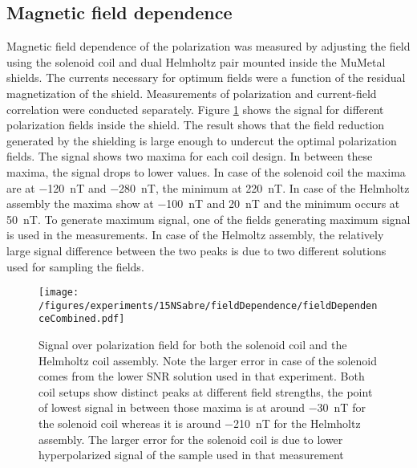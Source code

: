     \subsection{Magnetic field dependence}
    Magnetic field dependence of the polarization was measured by adjusting the field using the solenoid coil and dual Helmholtz pair mounted inside the MuMetal shields. The currents necessary for optimum fields were a function of the residual magnetization of the shield. Measurements of polarization and current-field correlation were conducted separately. Figure \ref{fig:results:15N:fieldDependence} shows the signal for different polarization fields inside the shield. The result shows that the field reduction generated by the shielding is large enough to undercut the optimal polarization fields. The signal shows two maxima for each coil design. In between these maxima, the signal drops to lower values. In case of the solenoid coil the maxima are at \SI{-120}{\nano\tesla} and \SI{-280}{\nano\tesla}, the minimum at \SI{220}{\nano\tesla}. In case of the Helmholtz assembly the maxima show at \SI{-100}{\nano\tesla} and \SI{20}{\nano\tesla} and the minimum occurs at \SI{50}{\nano\tesla}. To generate maximum signal, one of the fields generating maximum signal is used in the measurements. In case of the Helmoltz assembly, the relatively large signal difference between the two peaks is due to two different solutions used for sampling the fields.
        \begin{figure}
            \texttt{[image: /figures/experiments/15NSabre/fieldDependence/fieldDependenceCombined.pdf]}
            \caption[Magnetic field dependence]{Signal over polarization field for both the solenoid coil and the Helmholtz coil  assembly. Note the larger error in case of the solenoid comes from the lower SNR solution used in that experiment. Both coil setups  show distinct peaks at different field strengths, the point of lowest signal in between those maxima is at around \SI{-30}{\nano\tesla} for the solenoid coil whereas it is around \SI{-210}{\nano\tesla} for the Helmholtz assembly. The larger error for the solenoid coil is due to lower hyperpolarized signal of the sample used in that measurement}
            \label{fig:results:15N:fieldDependence}
        \end{figure}
